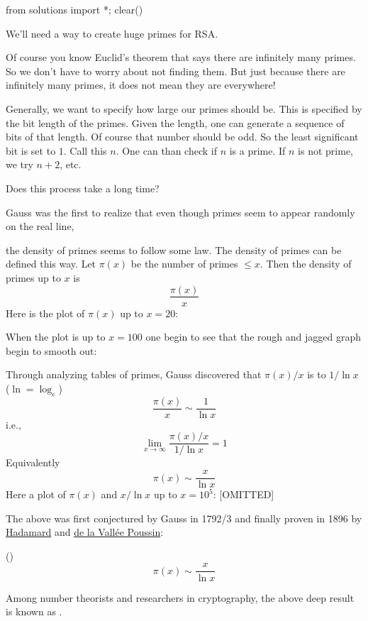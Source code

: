 \begin{python0}
from solutions import *; clear()
\end{python0}

We'll need a way to create huge primes for RSA.

Of course you know Euclid's theorem that says
there are infinitely many primes.
So we don't have to worry about not finding them.
But just because there are infinitely many primes, it does not mean
they are everywhere!

Generally, we want to specify how large our primes should be.
This is specified by the bit length of the primes.
Given the length, one can generate a sequence of bits of that length.
Of course that number should be odd.
So the least significant bit is set to $1$.
Call this $n$.
One can than check if $n$ is a prime.
If $n$ is not prime, we try $n + 2$, etc.

Does this process take a long time?

Gauss was the first to realize that even though primes seem to appear
randomly on the real line,

the density of primes seems to follow some
law.
The density of primes can be defined this way.
Let $\pi(x)$ be the number of primes $\leq x$.
Then the density of primes up to $x$ is
\[
\frac{\pi(x)}{x}
\]
Here is the plot of $\pi(x)$ up to $x = 20$:

When the plot is up to $x = 100$ one begin to see that the
rough and jagged graph begin to smooth out:


Through analyzing tables of primes, Gauss discovered that
$\pi(x)/x$ is  to $1/\ln x$ ($\ln = \log_e$)
\[
\frac{\pi(x)}{x} \sim \frac{1}{\ln x}
\]
i.e.,
\[
\lim_{x \rightarrow \infty} \frac{\pi(x)/x}{1/\ln x} = 1
\]
Equivalently
\[
\pi(x) \sim \frac{x}{\ln x}
\]
Here a plot of $\pi(x)$ and $x/\ln x$ up to $x = 10^5$:
[OMITTED]

The above was first conjectured by Gauss in 1792/3
and finally proven in 1896 by
\href{https://en.wikipedia.org/wiki/Jacques_Hadamard}{Hadamard}
and
\href{https://en.wikipedia.org/wiki/Charles_Jean_de_la_Vall%C3%A9e_Poussin}{de la Vallée Poussin}:

\begin{thm} \textnormal{()}
\[
\pi(x) \sim \frac{x}{\ln x}
\]  
\end{thm}

Among number theorists and researchers in cryptography,
the above deep result is known as .

